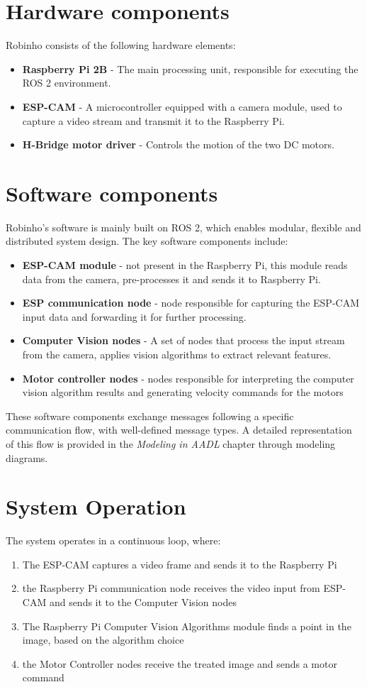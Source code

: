 \documentclass[
    12pt, 
    a4paper, 
    chapter=TITLE,		%
    section=TITLE,		%
    oneside,            %
    english
]{abntex2}
\begin{document}
\section{Hardware components}
Robinho consists of the following hardware elements: 
\begin{itemize}
    \item \textbf{Raspberry Pi 2B} - The main processing unit, responsible for executing the ROS 2 environment.
    \item \textbf{ESP-CAM} - A microcontroller equipped with a camera module, used to capture a video stream and transmit it to the Raspberry Pi.
    \item \textbf{H-Bridge motor driver} - Controls the motion of the two DC motors.
\end{itemize}

\section{Software components}
Robinho's software is mainly built on ROS 2, which enables modular, flexible and distributed system design. The key software components include:
\begin{itemize}
    \item \textbf{ESP-CAM module} - not present in the Raspberry Pi, this module reads data from the camera, pre-processes it and sends it to Raspberry Pi.
    \item \textbf{ESP communication node} - node responsible for capturing the ESP-CAM input data and forwarding it for further processing.
    \item \textbf{Computer Vision nodes} - A set of nodes that process the input stream from the camera, applies vision algorithms to extract relevant features.
    \item \textbf{Motor controller nodes} - nodes responsible for interpreting the computer vision algorithm results and generating velocity commands for the motors
\end{itemize}
These software components exchange messages following a specific communication flow, with well-defined message types. A detailed representation of this flow is provided in the \textit{Modeling in AADL} chapter through modeling diagrams.

\section{System Operation}
The system operates in a continuous loop, where:
\begin{enumerate}
    \item The ESP-CAM captures a video frame and sends it to the Raspberry Pi
    \item the Raspberry Pi communication node receives the video input from ESP-CAM and sends it to the Computer Vision nodes 
    \item The Raspberry Pi Computer Vision Algorithms module finds a point in the image, based on the algorithm choice
    \item the Motor Controller nodes receive the treated image and sends a motor command
\end{enumerate}
\end{document}
